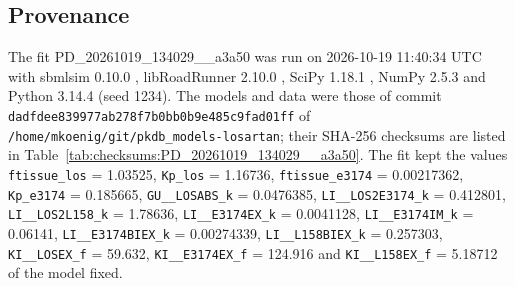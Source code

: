 \subsection{Provenance}

The fit PD\_20261019\_134029\_\_a3a50 was run on 2026-10-19 11:40:34 UTC with sbmlsim 0.10.0 \cite{Koenig2026_sbmlsim}, libRoadRunner 2.10.0 \cite{Welsh2023}, SciPy 1.18.1 \cite{Virtanen2020}, NumPy 2.5.3 \cite{Harris2020} and Python 3.14.4 (seed 1234). The models and data were those of commit \texttt{dadfdee839977ab278f7b0bb0b9e485c9fad01ff} of \texttt{/home/mkoenig/git/pkdb\_models-losartan}; their SHA-256 checksums are listed in Table~\ref{tab:checksums:PD_20261019_134029__a3a50}. The fit kept the values \texttt{ftissue\_los} = 1.03525, \texttt{Kp\_los} = 1.16736, \texttt{ftissue\_e3174} = 0.00217362, \texttt{Kp\_e3174} = 0.185665, \texttt{GU\_\_LOSABS\_k} = 0.0476385, \texttt{LI\_\_LOS2E3174\_k} = 0.412801, \texttt{LI\_\_LOS2L158\_k} = 1.78636, \texttt{LI\_\_E3174EX\_k} = 0.0041128, \texttt{LI\_\_E3174IM\_k} = 0.06141, \texttt{LI\_\_E3174BIEX\_k} = 0.00274339, \texttt{LI\_\_L158BIEX\_k} = 0.257303, \texttt{KI\_\_LOSEX\_f} = 59.632, \texttt{KI\_\_E3174EX\_f} = 124.916 and \texttt{KI\_\_L158EX\_f} = 5.18712 of the model fixed.

